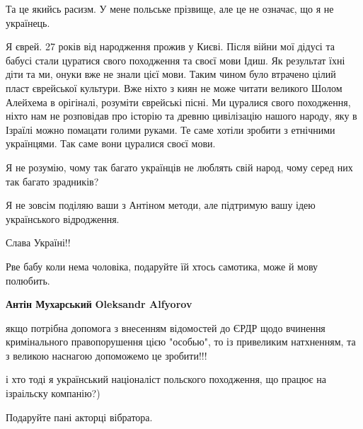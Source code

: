 \begin{itemize}
Та це якийсь расизм. У мене польське прізвище, але це не означає, що я не українець.

 

Я єврей. 27 років від народження прожив у Києві. Після війни мої дідусі та
бабусі стали цуратися свого походження та своєї мови Ідиш. Як результат їхні
діти та ми, онуки вже не знали цієї мови. Таким чином було втрачено цілий пласт
єврейської культури. Вже ніхто з киян не може читати великого Шолом Алейхема в
орігіналі, розуміти єврейські пісні. Ми цуралися свого походження, ніхто нам не
розповідав про історію та древню цивілізацію нашого народу, яку в Ізраїлі можно
помацати голими руками. Те саме хотіли зробити з етнічними українцями. Так саме
вони цуралися своєї мови.

Я не розумію, чому так багато українців не люблять свій народ, чому серед них
так багато зрадників?

Я не зовсім поділяю ваши з Антіном методи, але підтримую вашу ідею українського
відродження.

Слава Україні!!

 
Рве бабу коли нема чоловіка, подаруйте їй хтось самотика, може й мову полюбить.

 
\textbf{Антін Мухарський} \textbf{Oleksandr Alfyorov} 

якщо потрібна допомога з
внесенням відомостей до ЄРДР щодо вчинення кримінального правопорушення цією
"особью", то із привеликим натхненням, та з великою наснагою допоможемо це
зробити!!!


 
і хто тоді я український націоналіст польского походження, що працює на ізраільску компанію?)

 
Подаруйте пані акторці вібратора.


\end{itemize}

